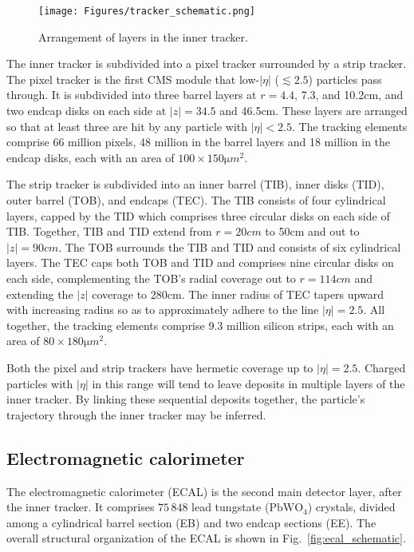 \begin{figure}[hbtp]
  \begin{center}
    \texttt{[image: Figures/tracker\_schematic.png]}
    \caption{
    Arrangement of layers in the inner tracker.
    }
    \label{fig:inner_tracker}
  \end{center}
\end{figure}

The inner tracker is subdivided into a pixel tracker surrounded by a strip tracker. The pixel tracker is the first CMS module that
low-$|\eta|$ ($\lesssim 2.5$) particles pass through. It is subdivided into three barrel layers at $r = 4.4$, 7.3, and 10.2\unit{cm},
and two endcap disks on each side at $|z| = 34.5$ and 46.5\unit{cm}. These layers are arranged so that at least three are hit by
any particle with $|\eta| < 2.5$.
The tracking elements comprise 66 million pixels, 48 million in the barrel layers
and 18 million in the endcap disks, each with an area of $100{\times}150\unit{\micro m}^{2}$.

The strip tracker is subdivided into an inner barrel (TIB), inner disks (TID), outer barrel (TOB), and endcaps (TEC).
The TIB consists of four cylindrical layers, capped by the TID which comprises three circular disks on each side of TIB.
Together, TIB and TID extend from $r = 20\unit{cm}$ to 50\unit{cm} and out to $|z| = 90\unit{cm}$.
The TOB surrounds the TIB and TID and consists of six cylindrical layers. The TEC caps both TOB and TID and comprises
nine circular disks on each side, complementing the TOB's radial coverage out to $r = 114\unit{cm}$ and extending the $|z|$ coverage
to 280\unit{cm}. The inner radius of TEC tapers upward with increasing radius so as to approximately adhere to the line $|\eta| = 2.5$.
All together, the tracking elements comprise 9.3 million silicon strips, each with an area of $80{\times}180\unit{\micro m}^{2}$.

Both the pixel and strip trackers have hermetic coverage up to $|\eta| = 2.5$. Charged particles with $|\eta|$ in this range will
tend to leave deposits in multiple layers of the inner tracker. By linking these sequential deposits together, the particle's trajectory through the inner
tracker may be inferred.

\subsection{Electromagnetic calorimeter} \label{sec:LHCCMS_CMS_ECAL}
The electromagnetic calorimeter (ECAL) is the second main detector layer, after the inner tracker. It comprises $75\,848$ lead tungstate ($\mathrm{PbWO}_{4}$)
crystals, divided among a cylindrical barrel section (EB) and two endcap sections (EE). The overall structural organization of the ECAL is shown in Fig.~\ref{fig:ecal_schematic}.

